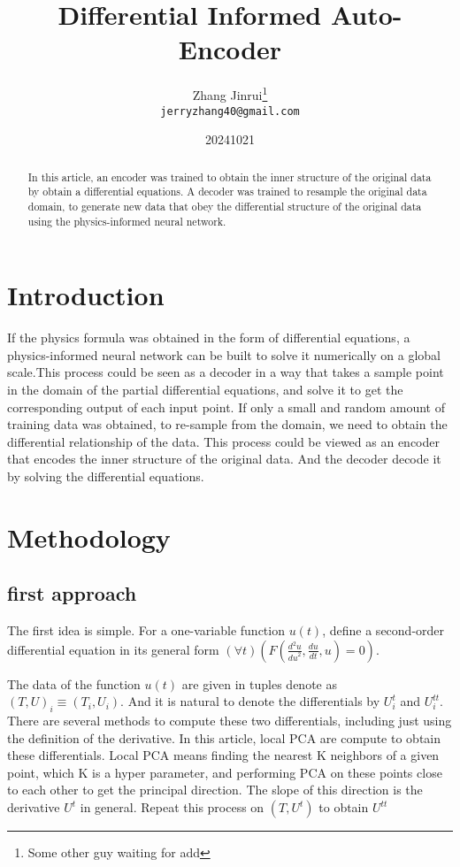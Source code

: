 \documentclass{article}
\title{Differential Informed Auto-Encoder}
\author{Zhang Jinrui\thanks{Some other guy waiting for add} \\ \texttt{jerryzhang40@gmail.com}}
\date{20241021}  %
\begin{document}
\maketitle

\begin{abstract}
    In this article, an encoder was trained to obtain the inner
    structure of the original data by obtain a differential equations.
    A decoder was trained to resample the original data domain, to generate new data that obey the differential structure of the original data using the physics-informed neural network\cite[PINN]{raissi2017physics}.
\end{abstract}

\section{Introduction}
If the physics formula was obtained in the form of differential equations,
a physics-informed neural network can be built to solve it numerically
on a global scale\cite[PINN]{raissi2017physics}.This process could be seen
as a decoder in a way that takes a sample point in the domain of
the partial differential equations, and solve it to get the corresponding
output of each input point. If only a small and random amount of
training data was obtained, to re-sample from the domain, we need
to obtain the differential relationship of the data. This process
could be viewed as an encoder that encodes the inner structure of
the original data. And the decoder decode it by solving the
differential equations.

\section{Methodology}
\subsection{first approach}
The first idea is simple. For a one-variable function $u(t)$,
define a second-order differential equation
in its general form $(\forall t)(F(\frac{d^2u}{{du}^2},\frac{du}{dt},u)=0)$.

The data of the function $u(t)$ are given in tuples denote as
$(T,U)_i\equiv(T_i,U_i)$. And it is natural to denote the differentials
by $U^{t}_{i}$ and $U^{tt}_{i}$. There are several methods to compute
these two differentials, including just using the definition of
the derivative. In this article, local PCA are compute to obtain
these differentials. Local PCA means finding the nearest K neighbors
of a given point, which K is a hyper parameter, and performing PCA
on these points close to each other to get the principal direction.
The slope of this direction is the derivative $U^{t}$ in general.
Repeat this process on $(T,U^{t})$ to obtain $U^{tt}$
\end{document}
